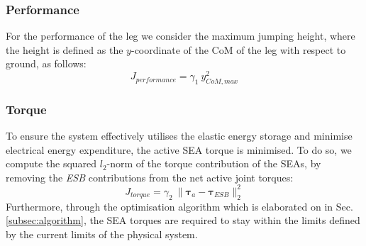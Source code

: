 \documentclass[letterpaper, 10 pt, conference]{ieeeconf}  %
\begin{document}
	\subsubsection{Performance}
	For the performance of the leg we consider the maximum jumping height, where the height is defined as the $y$-coordinate of the CoM of the leg with respect to ground, as follows:
	\begin{equation}
	J_{performance} = \gamma_1 \: y_{CoM,max}^2
	\end{equation}
	
	
	\subsubsection{Torque}
	To ensure the system effectively utilises the elastic energy storage and minimise electrical energy expenditure, the active SEA torque is minimised. To do so, we compute the squared $l_2$-norm of the torque contribution of the SEAs, by removing the \textit{ESB} contributions from the net active joint torques:
	\begin{equation}
	J_{torque}= \gamma_2 \: \| \boldsymbol{\tau}_a - \boldsymbol{\tau}_{ESB} \|_2^2
	\end{equation}
	Furthermore, through the optimisation algorithm which is elaborated on in Sec. \ref{subsec:algorithm}, the SEA torques are required to stay within the limits defined by the current limits of the physical system.
	
\end{document}
